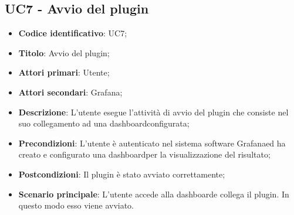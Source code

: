 \subsection{UC7 - Avvio del plugin}
\begin{itemize}
	\item \textbf{Codice identificativo}: UC7;
	\item \textbf{Titolo}: Avvio del plugin;
	\item \textbf{Attori primari}: Utente;
	\item \textbf{Attori secondari}: Grafana\glo;
	\item \textbf{Descrizione}: L'utente esegue l'attività di avvio del plugin che consiste nel suo collegamento ad una dashboard\glosp configurata;
	\item \textbf{Precondizioni}: L'utente è autenticato nel sistema software Grafana\glosp ed ha creato e configurato una dashboard\glosp per la visualizzazione del risultato;
	\item \textbf{Postcondizioni}: Il plugin è stato avviato correttamente;
	\item \textbf{Scenario principale}: L'utente accede alla dashboard\glosp e collega il plugin. In questo modo esso viene avviato.
\end{itemize}
